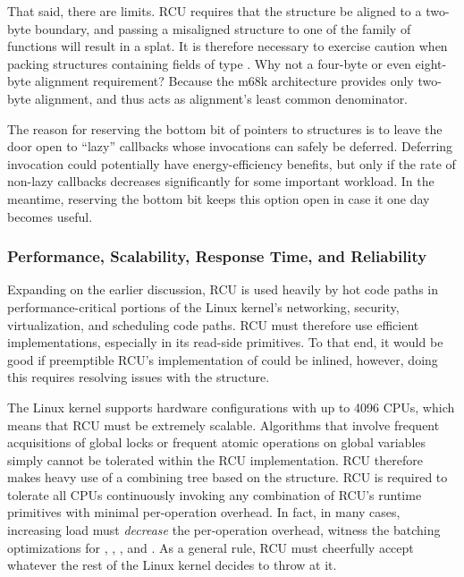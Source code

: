 That said, there are limits.
RCU requires that the 
structure be aligned to a two-byte boundary, and passing a misaligned
 structure to one of the  family of functions
will result in a splat.
It is therefore necessary to exercise caution
when packing structures containing fields of type .
Why not
a four-byte or even eight-byte alignment requirement?
Because the m68k
architecture provides only two-byte alignment, and thus acts as
alignment's least common denominator.

The reason for reserving the bottom bit of pointers to 
structures is to leave the door open to ``lazy'' callbacks whose
invocations can safely be deferred. Deferring invocation could
potentially have energy-efficiency benefits, but only if the rate of
non-lazy callbacks decreases significantly for some important workload.
In the meantime, reserving the bottom bit keeps this option open in case
it one day becomes useful.


\subsubsection{Performance, Scalability, Response Time, and Reliability}

Expanding on the earlier discussion, %
RCU is used heavily by
hot code paths in performance-critical portions of the Linux kernel's
networking, security, virtualization, and scheduling code paths.
RCU
must therefore use efficient implementations, especially in its
read-side primitives.
To that end, it would be good if preemptible RCU's
implementation of  could be inlined, however, doing
this requires resolving  issues with the 
structure.

The Linux kernel supports hardware configurations with up to 4096 CPUs,
which means that RCU must be extremely scalable.
Algorithms that involve
frequent acquisitions of global locks or frequent atomic operations on
global variables simply cannot be tolerated within the RCU
implementation. RCU therefore makes heavy use of a combining tree based
on the  structure.
RCU is required to tolerate all CPUs
continuously invoking any combination of RCU's runtime primitives with
minimal per-operation overhead.
In fact, in many cases, increasing load
must \emph{decrease} the per-operation overhead, witness the batching
optimizations for , ,
, and .
As a general
rule, RCU must cheerfully accept whatever the rest of the Linux kernel
decides to throw at it.

